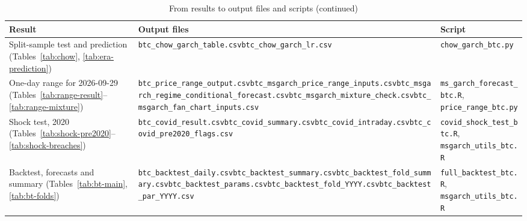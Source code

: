 \documentclass[12pt,a4paper]{article}
\begin{document}
\begin{table}[H]
	\centering
	\footnotesize
	\caption{From results to output files and scripts (continued)}
	\raggedright
	\begin{tabular}{p{3.9cm}p{6.2cm}p{3.3cm}}
		\toprule
		Result & Output files & Script \\
		\midrule
		Split-sample test and prediction (Tables~\ref{tab:chow}, \ref{tab:era-prediction}) & \texttt{btc\_\allowbreak{}chow\_\allowbreak{}garch\_\allowbreak{}table.csv}\newline \texttt{btc\_\allowbreak{}chow\_\allowbreak{}garch\_\allowbreak{}lr.csv} & \texttt{chow\_\allowbreak{}garch\_\allowbreak{}btc.py} \\
		\addlinespace
		One-day range for 2026-09-29 (Tables~\ref{tab:range-result}--\ref{tab:range-mixture}) & \texttt{btc\_\allowbreak{}price\_\allowbreak{}range\_\allowbreak{}output.csv}\newline \texttt{btc\_\allowbreak{}msgarch\_\allowbreak{}price\_\allowbreak{}range\_\allowbreak{}inputs.csv}\newline \texttt{btc\_\allowbreak{}msgarch\_\allowbreak{}regime\_\allowbreak{}conditional\_\allowbreak{}forecast.csv}\newline \texttt{btc\_\allowbreak{}msgarch\_\allowbreak{}mixture\_\allowbreak{}check.csv}\newline \texttt{btc\_\allowbreak{}msgarch\_\allowbreak{}fan\_\allowbreak{}chart\_\allowbreak{}inputs.csv} & \texttt{ms\_\allowbreak{}garch\_\allowbreak{}forecast\_\allowbreak{}btc.R}, \texttt{price\_\allowbreak{}range\_\allowbreak{}btc.py} \\
		\addlinespace
		Shock test, 2020 (Tables~\ref{tab:shock-pre2020}--\ref{tab:shock-breaches}) & \texttt{btc\_\allowbreak{}covid\_\allowbreak{}result.csv}\newline \texttt{btc\_\allowbreak{}covid\_\allowbreak{}summary.csv}\newline \texttt{btc\_\allowbreak{}covid\_\allowbreak{}intraday.csv}\newline \texttt{btc\_\allowbreak{}covid\_\allowbreak{}pre2020\_\allowbreak{}flags.csv} & \texttt{covid\_\allowbreak{}shock\_\allowbreak{}test\_\allowbreak{}btc.R}, \texttt{msgarch\_\allowbreak{}utils\_\allowbreak{}btc.R} \\
		\addlinespace
		Backtest, forecasts and summary (Tables~\ref{tab:bt-main}, \ref{tab:bt-folds}) & \texttt{btc\_\allowbreak{}backtest\_\allowbreak{}daily.csv}\newline \texttt{btc\_\allowbreak{}backtest\_\allowbreak{}summary.csv}\newline \texttt{btc\_\allowbreak{}backtest\_\allowbreak{}fold\_\allowbreak{}summary.csv}\newline \texttt{btc\_\allowbreak{}backtest\_\allowbreak{}params.csv}\newline \texttt{btc\_\allowbreak{}backtest\_\allowbreak{}fold\_\allowbreak{}YYYY.csv}\newline \texttt{btc\_\allowbreak{}backtest\_\allowbreak{}par\_\allowbreak{}YYYY.csv} & \texttt{full\_\allowbreak{}backtest\_\allowbreak{}btc.R}, \texttt{msgarch\_\allowbreak{}utils\_\allowbreak{}btc.R} \\

\end{tabular}
\end{table}
\end{document}
